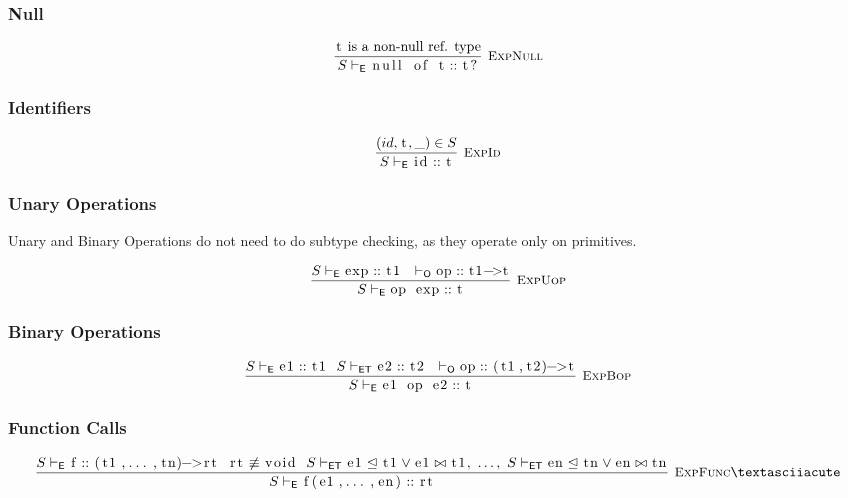 \documentclass{article}
\newcommand{\code}[1]{\lstinline[columns=fixed]{#1}}
\newcommand{\drmrule}[5]{\frac{#1}{#2\vdash_{\mathsf{#3}}#4}\textsc{\ \small{#5}}}
\newcommand{\ruleapp}[1]{\vdash_{\mathsf{#1}}}
\newcommand{\mc}[1]{\textnormal{\code{#1}}}
\begin{document}
			\subsubsection{Null}
			
				\begin{align*}
					\drmrule{\textnormal{\code{t} is a non-null ref. type}}{S}{E}{\mc{null of t} :: \mc{t?}}{ExpNull}
				\end{align*}
			
			\subsubsection{Identifiers}
			
				\begin{align*}
					\drmrule{(id,\mc{t},\_)\in S}{S}{E}{\mc{id} :: \mc{t}}{ExpId}
				\end{align*}
			
			\subsubsection{Unary Operations}
			
				Unary and Binary Operations do not need to do subtype checking, as they operate only on primitives.
			
				\begin{align*}
					\drmrule{S\ruleapp{E}\mc{exp}::\mc{t1}\ \ \ruleapp{O}\mc{op}::\mc{t1->t}}{S}{E}{\mc{op exp}::\mc{t}}{ExpUop}
				\end{align*}
			
			\subsubsection{Binary Operations}
			
				\begin{align*}
					\drmrule{S\ruleapp{E}\mc{e1}::\mc{t1}\ \ S\ruleapp{ET}\mc{e2}::\mc{t2}\ \ \ruleapp{O}\mc{op}::\mc{(t1,t2)->t}}{S}{E}{\mc{e1 op e2} :: \mc{t}}{ExpBop}
				\end{align*}
			
			\subsubsection{Function Calls}
			
				\begin{align*}
					\drmrule{S\ruleapp{E}\mc{f}::\mc{(t1,...,tn)->rt}\ \ \mc{rt}\not\equiv\mc{void}\ \  S\ruleapp{ET}\mc{e1}\trianglelefteq\mc{t1}\vee\mc{e1}\bowtie\mc{t1},\ \dots,\ S\ruleapp{ET}\mc{en}\trianglelefteq\mc{tn}\vee\mc{en}\bowtie\mc{tn}}{S}{E}{\mc{f(e1,...,en)}::\mc{rt}}{ExpFunc}´
				\end{align*}
				
\end{document}
